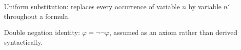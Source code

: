 \begin{definition}\label{def:formula_uniformsub}
  \leanok
  Uniform substitution: replaces every occurrence of variable $n$ by variable $n'$
  throughout a formula.
\end{definition}

\begin{definition}\label{ax:dne_elim}
  \leanok
  Double negation identity: $\varphi = \neg\neg\varphi$, assumed as an axiom
  rather than derived syntactically.
\end{definition}
